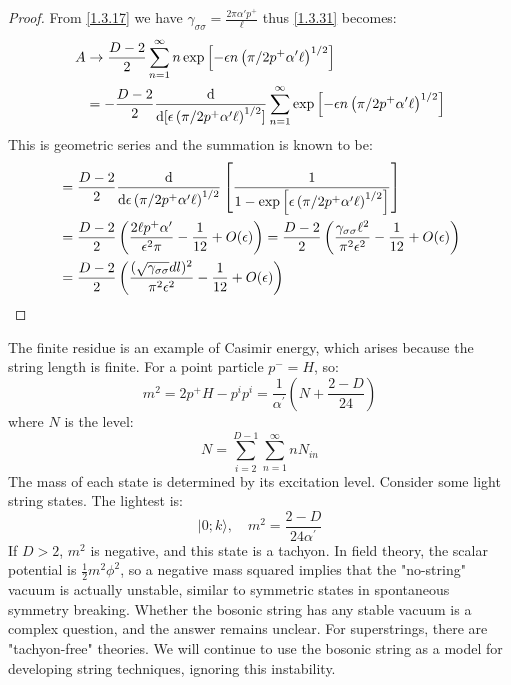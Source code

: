 \begin{tcolorbox}
	\begin{proof}
		From \eqref{1.3.17} we have $\gamma_{\sigma\sigma}=\frac{2\pi\alpha'p^{+}}{\ell}$ thus \eqref{1.3.31} becomes:
		\begin{equation}
			\begin{aligned}
				A & \rightarrow \frac{D-2}{2} \sum_{n=1}^{\infty} n \exp \left[-\epsilon n\left(\pi / 2 p^{+} \alpha^{\prime} \ell\right)^{1 / 2}\right]\\
				&=-\frac{D-2}{2} \dv{[\epsilon\left(\pi / 2 p^{+} \alpha^{\prime} \ell\right)^{1 / 2}]}\sum_{n=1}^{\infty} \exp \left[-\epsilon n\left(\pi / 2 p^{+} \alpha^{\prime} \ell\right)^{1 / 2}\right]
			\end{aligned}
		\end{equation}
		This is geometric series and the summation is known to be:
		\begin{equation}
			\begin{aligned}
				&=\frac{D-2}{2} \dv{\epsilon\left(\pi / 2 p^{+} \alpha^{\prime} \ell\right)^{1 / 2}}\left[\frac{1}{1-\exp \left[\epsilon\left(\pi / 2 p^{+} \alpha^{\prime} \ell\right)^{1 / 2}\right]}\right]\\
				&=\frac{D-2}{2}\left(\frac{2 \ell p^{+} \alpha^{\prime}}{\epsilon^{2} \pi}-\frac{1}{12}+O(\epsilon)\right)=\frac{D-2}{2}\left(\frac{\gamma_{\sigma\sigma}\ell^2}{\pi^2\epsilon^2}-\frac{1}{12}+O(\epsilon)\right)\\
				&=\frac{D-2}{2}\left(\frac{(\sqrt{\gamma_{\sigma\sigma}}dl)^2}{\pi^2\epsilon^2}-\frac{1}{12}+O(\epsilon)\right)
			\end{aligned}
		\end{equation}
	\end{proof}
\end{tcolorbox}
The finite residue is an example of Casimir energy, which arises because the string length is finite. For a point particle $p^-=H$, so: 
\begin{equation}
	m^{2}=2 p^{+} H-p^{i} p^{i}=\frac{1}{\alpha^{\prime}}\left(N+\frac{2-D}{24}\right)
\end{equation}
where $N$ is the level: 
\begin{equation}
	N=\sum_{i=2}^{D-1} \sum_{n=1}^{\infty} n N_{i n}
\end{equation}
The mass of each state is determined by its excitation level. Consider some light string states. The lightest is: 
\begin{equation}
	|0 ; k\rangle, \quad m^{2}=\frac{2-D}{24 \alpha^{\prime}}
\end{equation}
If $D>2$, $m^2$ is negative, and this state is a tachyon. 
In field theory, the scalar potential is $\frac{1}{2}m^2\phi^2$, so a negative mass squared implies that the "no-string" vacuum is actually unstable, similar to symmetric states in spontaneous symmetry breaking. Whether the bosonic string has any stable vacuum is a complex question, and the answer remains unclear. For superstrings, there are "tachyon-free" theories. We will continue to use the bosonic string as a model for developing string techniques, ignoring this instability. 


